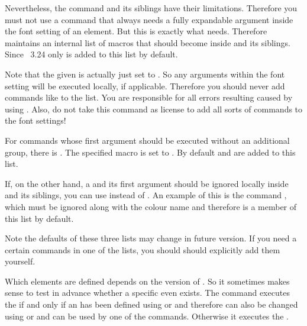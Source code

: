 Nevertheless, the  command and its
siblings have their limitations. Therefore you must not use a command that
always needs a fully expandable argument inside the font setting of an
element. But this is exactly what  needs.
Therefore \KOMAScript{} maintains an internal list of macros that
should become  inside  and
its siblings. Since \KOMAScript~3.24 only  is added to
this list by default.

Note that the given  is actually just set to . So
any arguments within the font setting will be executed locally, if applicable.
Therefore you should never add commands like  to the list.
You are responsible for all errors resulting caused by using
. Also, do not take this command as license to
add all sorts of commands to the font settings!

For commands whose first argument should be executed without an
additional group, there is . The specified
macro is set to . By default  and
 are added to this list.

If, on the other hand, a  and its first argument
should be ignored locally inside  and
its siblings, you can use  instead of
. An example of this is the command
, which must be ignored along with the colour name and therefore
is a member of this list by default.

Note the defaults of these three lists may change in future version. If you
need a certain commands in one of the lists, you should should explicitly add
them yourself.%
\EndIndexGroup


\begin{Declaration}
\end{Declaration}
Which elements are defined depends on the
version of \KOMAScript. So it sometimes makes sense to test in advance whether
a specific  even exists. The  command
executes the  if and only if an  has been
defined using  or
 and therefore can also be changed using
 or  and
can be used by one of the  commands. Otherwise it
executes the .%

